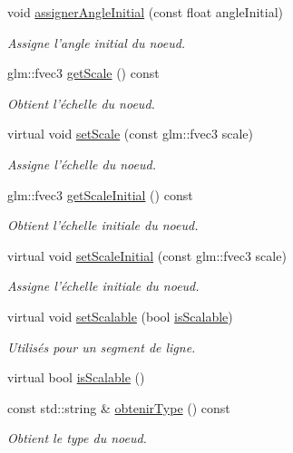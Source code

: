 \begin{DoxyCompactItemize}
void \hyperlink{group__inf2990_gaf0e7fd3676087b70949012a945000509}{assigner\-Angle\-Initial} (const float angle\-Initial)
\begin{DoxyCompactList}\small\item\em Assigne l'angle initial du noeud. \end{DoxyCompactList}\item 
glm\-::fvec3 \hyperlink{group__inf2990_ga153a0490acbbaeda4647496e51d37894}{get\-Scale} () const 
\begin{DoxyCompactList}\small\item\em Obtient l'échelle du noeud. \end{DoxyCompactList}\item 
virtual void \hyperlink{group__inf2990_gaef8fd99796f85418adac496160a3350b}{set\-Scale} (const glm\-::fvec3 scale)
\begin{DoxyCompactList}\small\item\em Assigne l'échelle du noeud. \end{DoxyCompactList}\item 
glm\-::fvec3 \hyperlink{group__inf2990_gab229ec2d195c9e9bfa1a4c0f80b582ca}{get\-Scale\-Initial} () const 
\begin{DoxyCompactList}\small\item\em Obtient l'échelle initiale du noeud. \end{DoxyCompactList}\item 
virtual void \hyperlink{group__inf2990_gae51f2e4da1ff9308a55324d4aafd72db}{set\-Scale\-Initial} (const glm\-::fvec3 scale)
\begin{DoxyCompactList}\small\item\em Assigne l'échelle initiale du noeud. \end{DoxyCompactList}\item 
virtual void \hyperlink{group__inf2990_gac84509676c191712e87dd99bab723d90}{set\-Scalable} (bool \hyperlink{group__inf2990_gaa764aeb7ced23c3c5ffd2b4d202f79fa}{is\-Scalable})
\begin{DoxyCompactList}\small\item\em Utilisés pour un segment de ligne. \end{DoxyCompactList}\item 
virtual bool \hyperlink{group__inf2990_gaa764aeb7ced23c3c5ffd2b4d202f79fa}{is\-Scalable} ()
\item 
const std\-::string \& \hyperlink{group__inf2990_ga2df7c53ab456cc88bce73f7eb913e3e6}{obtenir\-Type} () const 
\begin{DoxyCompactList}\small\item\em Obtient le type du noeud. \end{DoxyCompactList}\item 

\end{DoxyCompactItemize}
